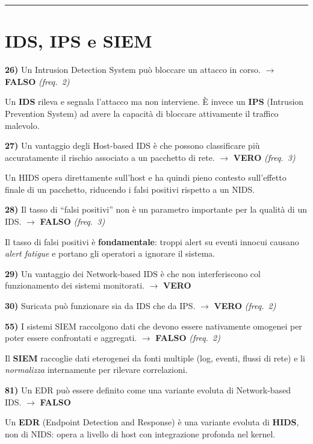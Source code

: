 \documentclass[12pt, a4paper]{report}
\newcommand{\vero}{\textcolor{verdeanswer}{\textbf{VERO}}}
\newcommand{\falso}{\textcolor{rossoanswer}{\textbf{FALSO}}}
\newcommand{\freq}[1]{\textcolor{freqcolor}{\textit{(freq.\ #1)}}}
\begin{document}
\noindent\rule{\textwidth}{0.4pt}

\section{IDS, IPS e SIEM}

\noindent\textbf{26)} Un Intrusion Detection System può bloccare un attacco in corso. $\to$ \falso{} \freq{2}

\medskip
\noindent Un \textbf{IDS} rileva e segnala l'attacco ma non interviene. È invece un \textbf{IPS} (Intrusion Prevention System) ad avere la capacità di bloccare attivamente il traffico malevolo.

\medskip
\noindent\textbf{27)} Un vantaggio degli Host-based IDS è che possono classificare più accuratamente il rischio associato a un pacchetto di rete. $\to$ \vero{} \freq{3}

\medskip
\noindent Un HIDS opera direttamente sull'host e ha quindi pieno contesto sull'effetto finale di un pacchetto, riducendo i falsi positivi rispetto a un NIDS.

\medskip
\noindent\textbf{28)} Il tasso di ``falsi positivi'' non è un parametro importante per la qualità di un IDS. $\to$ \falso{} \freq{3}

\medskip
\noindent Il tasso di falsi positivi è \textbf{fondamentale}: troppi alert su eventi innocui causano \textit{alert fatigue} e portano gli operatori a ignorare il sistema.

\medskip
\noindent\textbf{29)} Un vantaggio dei Network-based IDS è che non interferiscono col funzionamento dei sistemi monitorati. $\to$ \vero{}

\medskip
\noindent\textbf{30)} Suricata può funzionare sia da IDS che da IPS. $\to$ \vero{} \freq{2}

\medskip
\noindent\textbf{55)} I sistemi SIEM raccolgono dati che devono essere nativamente omogenei per poter essere confrontati e aggregati. $\to$ \falso{} \freq{2}

\medskip
\noindent Il \textbf{SIEM} raccoglie dati eterogenei da fonti multiple (log, eventi, flussi di rete) e li \textit{normalizza} internamente per rilevare correlazioni.

\medskip
\noindent\textbf{81)} Un EDR può essere definito come una variante evoluta di Network-based IDS. $\to$ \falso{}

\medskip
\noindent Un \textbf{EDR} (Endpoint Detection and Response) è una variante evoluta di \textbf{HIDS}, non di NIDS: opera a livello di host con integrazione profonda nel kernel.
\end{document}
